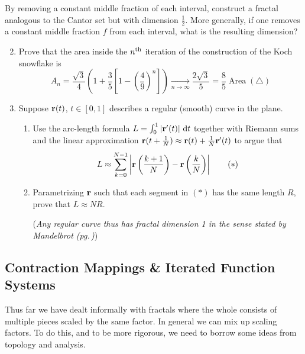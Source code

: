 \begin{exercises}
	\exstart By removing a constant middle fraction of each interval, construct a fractal analogous to the Cantor set but with dimension $\frac 12$. More generally, if one removes a constant middle fraction $f$ from each interval, what is the resulting dimension?	
	
	\begin{enumerate}\setcounter{enumi}{1}\itemsep2pt
		\item Prove that the area inside the $n\textsuperscript{th}$ iteration of the construction of the Koch snowflake is
		\[
			A_n=\frac{\sqrt 3}{4}\left(1+\frac 35\left[1-\left(\frac 49\right)^n\right]\right)
			\xrightarrow[n\to\infty]{} \frac{2\sqrt 3}5
			=\frac 85\operatorname{Area}(\triangle)
		\]
		
		
		\item\label{exs:fractaldiffcurve} Suppose ${\mathbf{r}}(t)$, $t\in [0,1]$ describes a regular (smooth) curve in the plane.
		\begin{enumerate}
	  	\item Use the arc-length formula $L=\int_0^1\left| {\mathbf{r}}'(t)\right|\,{\mathrm{d} t}$ together with Riemann sums and the linear approximation ${\mathbf{r}}(t+\frac 1N)\approx{\mathbf{r}}(t)+\frac 1N{\mathbf{r}}'(t)$ to argue that
	  	\[
	  		L\approx\sum_{k=0}^{N-1}\left| {\mathbf{r}}\left(\frac{k+1}N\right)-{\mathbf{r}}\left(\frac{k}N\right)\right| \tag{$\ast$}
	  	\]
	  	
	
	  	\item Parametrizing ${\mathbf{r}}$ such that each segment in $(\ast)$ has the same length $R$, prove that $L\approx NR$.\par
	  	(\emph{Any regular curve thus has fractal dimension 1 in the sense stated by Mandelbrot (pg.\,\pageref{sec:fracdefn})})
		\end{enumerate}
		
	\end{enumerate}
\end{exercises}


\clearpage


\subsection{Contraction Mappings \& Iterated Function Systems}

Thus far we have dealt informally with fractals where the whole consists of multiple pieces scaled by the same factor. In general we can mix up scaling factors. To do this, and to be more rigorous, we need to borrow some ideas from topology and analysis.

